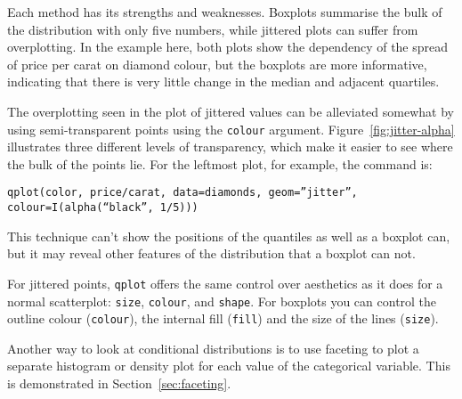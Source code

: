 Each method has its strengths and weaknesses.  Boxplots summarise the bulk of the distribution with only five numbers, while jittered plots can suffer from overplotting.  In the example here, both plots show the dependency of the spread of price per carat on diamond colour, but the boxplots are more informative, indicating that there is very little change in the median and adjacent quartiles.

The overplotting seen in the plot of jittered values can be alleviated somewhat by using semi-transparent points using the {\tt colour} argument. Figure~\ref{fig:jitter-alpha} illustrates three different levels of transparency, which make it easier to see where the bulk of the points lie.  For the leftmost plot, for example, the command is:

{\tt qplot(color, price/carat, data=diamonds, geom=''jitter'', colour=I(alpha(``black'', 1/5)))}


 This technique can't show the positions of the quantiles as well as a boxplot can, but it may reveal other features of the distribution that a boxplot can not.

% 


% 
For jittered points, {\tt qplot} offers the same control over aesthetics as it does for  a normal scatterplot: {\tt size}, {\tt colour}, and {\tt shape}.  For boxplots you can control the outline colour ({\tt colour}), the internal fill ({\tt fill}) and the size of the lines ({\tt size}).

Another way to look at conditional distributions is to use faceting to plot a separate histogram or density plot for each value of the categorical variable.  This is demonstrated in Section~\ref{sec:faceting}.

